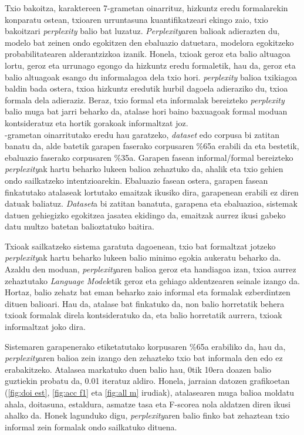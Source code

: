 \documentclass[information,article,submit,moreauthors,pdftex,10pt,a4paper]{Definitions/mdpi}
\begin{document}
Txio bakoitza, karaktereen 7-grametan oinarrituz, hizkuntz eredu formalarekin konparatu ostean, txioaren urruntasuna kuantifikatzeari ekingo zaio, txio bakoitzari \textit{perplexity} balio bat luzatuz. \textit{Perplexity}aren balioak adierazten du, modelo bat zeinen ondo egokitzen den ebaluazio datuetara, modelora egokitzeko probabilitatearen alderantzizkoa izanik. Honela, txioak geroz eta balio altuagoa lortu, geroz eta urrunago egongo da hizkuntz eredu formaletik, hau da, geroz eta balio altuagoak esango du informalagoa dela txio hori. \textit{perplexity} balioa txikiagoa baldin bada ostera, txioa hizkuntz eredutik hurbil dagoela adieraziko du, txioa formala dela adieraziz. Beraz, txio formal eta informalak bereizteko \textit{perplexity} balio muga bat jarri beharko da, atalase hori baino baxuagoak formal moduan kontsideratuz eta hortik gorakoak informaltzat joz.\\
-grametan oinarritutako eredu hau garatzeko, \textit{dataset} edo corpusa bi zatitan banatu da, alde batetik garapen faserako corpusaren \%65a erabili da eta bestetik, ebaluazio faserako corpusaren \%35a. Garapen fasean informal/formal bereizteko \textit{perplexity}ak hartu beharko lukeen balioa zehaztuko da, ahalik eta txio gehien ondo sailkatzeko intentzioarekin. Ebaluazio fasean ostera, garapen fasean finkatutako atalaseak lortutako emaitzak ikusiko dira, garapenean erabili ez diren datuak baliatuz. \textit{Dataset}a bi zatitan banatuta, garapena eta ebaluazioa, sistemak datuen gehiegizko egokitzea jasatea ekidingo da, emaitzak aurrez ikusi gabeko datu multzo batetan balioztatuko baitira.


Txioak sailkatzeko sistema garatuta dagoenean, txio bat formaltzat jotzeko \textit{perplexity}ak hartu beharko lukeen balio minimo egokia aukeratu beharko da. Azaldu den moduan, \textit{perplexity}aren balioa geroz eta handiagoa izan, txioa aurrez zehaztutako \textit{Language Model}etik geroz eta gehiago aldentzearen seinale izango da. Hortaz, balio zehatz bat eman beharko zaio informal eta formalak ezberdintzen dituen balioari. Hau da, atalase bat finkatuko da, non balio horretatik behera txioak formalak direla kontsideratuko da, eta balio horretatik aurrera, txioak informaltzat joko dira.

Sistemaren garapenerako etiketatutako korpusaren \%65a erabiliko da, hau da, \textit{perplexity}aren balioa zein izango den zehazteko txio bat informala den edo ez erabakitzeko. Atalasea markatuko duen balio hau, 0tik 10era doazen balio guztiekin probatu da, 0.01 iteratuz aldiro. Honela, jarraian datozen grafikoetan (\ref{fig:doi est}, \ref{fig:acc f1} eta \ref{fig:all m} irudiak), atalasearen muga balioa moldatu ahala, doitasuna, estaldura, asmatze tasa eta F-scorea nola aldatzen diren ikusi ahalko da. Honek lagunduko digu, \textit{perplexity}aren balio finko bat zehaztean txio informal zein formalak ondo sailkatuko dituena. 
\end{document}
